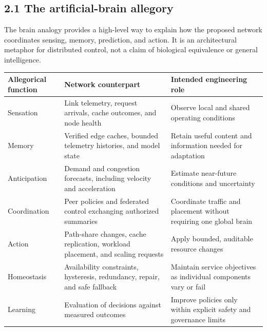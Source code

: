 \documentclass[
  american,
  11pt,
]{article}
\newcounter{none} %
\begin{document}
\subsection{2.1 The artificial-brain
allegory}\label{the-artificial-brain-allegory}

The brain analogy provides a high-level way to explain how the proposed
network coordinates sensing, memory, prediction, and action. It is an
architectural metaphor for distributed control, not a claim of
biological equivalence or general intelligence.

{\def\LTcaptype{none} %
\begin{longtable}[]{@{}
  >{\raggedright\arraybackslash}p{}
  >{\raggedright\arraybackslash}p{}
  >{\raggedright\arraybackslash}p{}@{}}
\toprule\noalign{}
\begin{minipage}[b]{\linewidth}\raggedright
Allegorical function
\end{minipage} & \begin{minipage}[b]{\linewidth}\raggedright
Network counterpart
\end{minipage} & \begin{minipage}[b]{\linewidth}\raggedright
Intended engineering role
\end{minipage} \\
\midrule\noalign{}
\endhead
\bottomrule\noalign{}
\endlastfoot
Sensation & Link telemetry, request arrivals, cache outcomes, and node
health & Observe local and shared operating conditions \\
Memory & Verified edge caches, bounded telemetry histories, and model
state & Retain useful content and information needed for adaptation \\
Anticipation & Demand and congestion forecasts, including velocity and
acceleration & Estimate near-future conditions and uncertainty \\
Coordination & Peer policies and federated control exchanging authorized
summaries & Coordinate traffic and placement without requiring one
global brain \\
Action & Path-share changes, cache replication, workload placement, and
scaling requests & Apply bounded, auditable resource changes \\
Homeostasis & Availability constraints, hysteresis, redundancy, repair,
and safe fallback & Maintain service objectives as individual components
vary or fail \\
Learning & Evaluation of decisions against measured outcomes & Improve
policies only within explicit safety and governance limits \\
\end{longtable}
}
\end{document}
